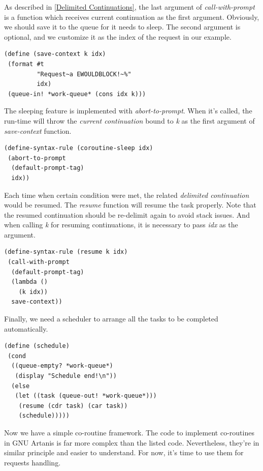 \documentclass[numbers,numberedpars]{sigplanconf}
\begin{document}
As described in \ref{Delimited Continuations}, the last argument of {\it call-with-prompt} is a function which receives current continuation
as the first argument. Obviously, we should save it to the queue for it needs to sleep. The second argument is optional, and we customize it
as the index of the request in our example.

\begin{lstlisting}
(define (save-context k idx)
 (format #t
         "Request~a EWOULDBLOCK!~%"
         idx)
 (queue-in! *work-queue* (cons idx k)))
\end{lstlisting}

The sleeping feature is implemented with {\it abort-to-prompt}. When it's called, the run-time will throw the {\it current continuation} bound to
{\it k} as the first argument of {\it save-context} function.

\begin{lstlisting}
(define-syntax-rule (coroutine-sleep idx)
 (abort-to-prompt
  (default-prompt-tag)
  idx))
\end{lstlisting}

Each time when certain condition were met, the related {\it delimited continuation} would be resumed. The {\it resume} function will resume the task
properly. Note that the resumed continuation should be re-delimit again to avoid stack issues. And when calling {\it k} for resuming continuations,
it is necessary to pass {\it idx} as the argument.

\begin{lstlisting}
(define-syntax-rule (resume k idx)
 (call-with-prompt
  (default-prompt-tag)
  (lambda ()
    (k idx))
  save-context))
\end{lstlisting}

Finally, we need a scheduler to arrange all the tasks to be completed automatically.

\begin{lstlisting}
(define (schedule)
 (cond
  ((queue-empty? *work-queue*)
   (display "Schedule end!\n"))
  (else
   (let ((task (queue-out! *work-queue*)))
    (resume (cdr task) (car task))
    (schedule)))))
\end{lstlisting}

Now we have a simple co-routine framework. The code to implement co-routines in GNU Artanis is far more complex than the listed code.
Nevertheless, they're in similar principle and easier to understand. For now, it's time to use them for requests handling.


\end{document}
